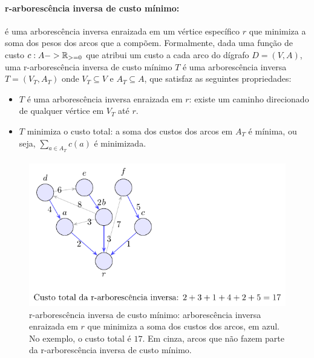 \documentclass[12pt,a4paper]{article}
\def\geq{\string>=}%
\def\to{->}%
\begin{document}
\paragraph{r-arborescência inversa de custo mínimo:}
é uma arborescência inversa enraizada em um vértice específico \(r\) que minimiza a soma dos pesos dos arcos que a compõem. Formalmente, dada uma função de custo \(c: A \to \mathbb{R}_{\geq 0}\) que atribui um custo a cada arco do dígrafo \(D = (V, A)\), uma r-arborescência inversa de custo mínimo \(T\) é uma arborescência inversa \(T = (V_T, A_T)\) onde \(V_T \subseteq V\) e \(A_T \subseteq A\), que satisfaz as seguintes propriedades:
\begin{itemize}
    \item \(T\) é uma arborescência inversa enraizada em \(r\): existe um caminho direcionado de qualquer vértice em \(V_T\) até \(r\).
    \item \(T\) minimiza o custo total: a soma dos custos dos arcos em \(A_T\) é mínima, ou seja, \(\sum_{a \in A_T} c(a)\) é minimizada.
\end{itemize}

\paragraph{}

\begin{figure}[H]
    \centering
    \includegraphics[width=0.9\linewidth]{figures/fig_r_arborescencia_inversa_custo_minimo.pdf}

    \caption{r-arborescência inversa de custo mínimo: arborescência inversa enraizada em $r$ que minimiza a soma dos custos dos arcos, em azul. No exemplo, o custo total é $17$. Em cinza, arcos que não fazem parte da r-arborescência inversa de custo mínimo.}
    \label{fig:r-arborescencia-inversa-custo-minimo}\end{figure}
\end{document}

